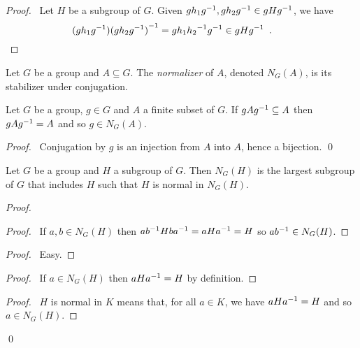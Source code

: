 \begin{proof}
\pf\ Let $H$ be a subgroup of $G$. Given $gh_1{g}^{-1},gh_2{g}^{-1} \in gH{g}^{-1}$, we have
\[ (gh_1{g}^{-1}){(gh_2{g}^{-1})}^{-1} = gh_1{h_2}^{-1}{g}^{-1} \in gH{g}^{-1} \enspace . \qquad \relax \]
\end{proof}

\begin{df}[Normalizer]
Let $G$ be a group and $A \subseteq G$. The \emph{normalizer} of $A$, denoted $N_G(A)$, is its stabilizer under conjugation.
\end{df}

\begin{prop}
Let $G$ be a group, $g \in G$ and $A$ a finite subset of $G$. If $gA{g}^{-1} \subseteq A$ then $gA{g}^{-1} = A$ and so $g \in N_G(A)$.
\end{prop}

\begin{proof}
\pf\ Conjugation by $g$ is an injection from $A$ into $A$, hence a bijection. \qed
\end{proof}


\begin{prop}
\label{prop:H-normal-in-NGH}
Let $G$ be a group and $H$ a subgroup of $G$. Then $N_G(H)$ is the largest subgroup of $G$ that includes $H$ such that $H$ is normal in $N_G(H)$.
\end{prop}

\begin{proof}
\pf
{}
\begin{proof}
	\pf\ If $a,b \in N_G(H)$ then $a{b}^{-1}Hb{a}^{-1} = aH{a}^{-1} = H$ so $a{b}^{-1} \in N_G(H)$.
\end{proof}
\begin{proof}
	\pf\ Easy.
\end{proof}
\begin{proof}
	\pf\ If $a \in N_G(H)$ then $aH{a}^{-1} = H$ by definition.
\end{proof}
\begin{proof}
	\pf\ $H$ is normal in $K$ means that, for all $a \in K$, we have $aH{a}^{-1} = H$ and so $a \in N_G(H)$.
\end{proof}
\qed
\end{proof}

